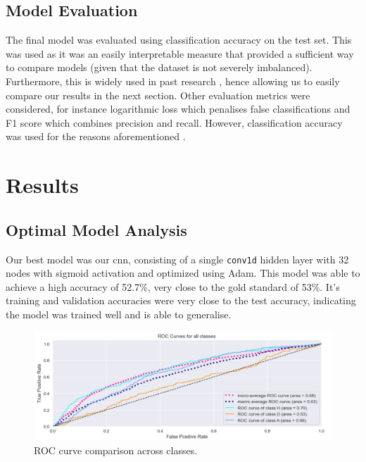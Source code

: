 \documentclass{article}
\newcommand{\sw}[1]{\texttt{#1}}
\begin{document}
\vspace{-0.6em}
\subsection{Model Evaluation}
\label{modeleval}

\vspace{-0.6em}
The final model was evaluated using classification accuracy on the test set. This was used as it was an easily interpretable measure that provided a sufficient way to compare models (given that the dataset is not severely imbalanced). Furthermore, this is widely used in past research \cite{horvat2020use}, hence allowing us to easily compare our results in the next section. Other evaluation metrics were considered, for instance logarithmic loss which penalises false classifications and F1 score which combines precision and recall. However, classification accuracy was used for the reasons aforementioned \cite{mishramediummetrics}. 

\vspace{-1.1em}
\section{Results}
\label{results}

\vspace{-0.6em}
\subsection{Optimal Model Analysis}
\label{optimalmodel}

\vspace{-0.6em}
Our best model was our \gls{cnn}, consisting of a single \sw{conv1d} hidden layer with 32 nodes with sigmoid activation and optimized using Adam. This model was able to achieve a high accuracy of 52.7\%, very close to the gold standard of 53\%. It's training and validation accuracies were very close to the test accuracy, indicating the model was trained well and is able to generalise.

\vspace{-1em}
\begin{figure}[!htb]
    \centering
    \includegraphics[width=0.9\linewidth]{Images/Figure 4.jpeg}
    \vspace{-0.9em}
    \caption{ROC curve comparison across classes.}
    \label{fig:ROC}
\end{figure}
\end{document}
